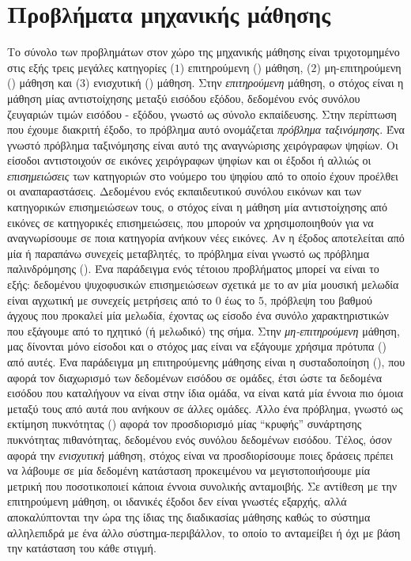 \section{Προβλήματα μηχανικής μάθησης}
Το σύνολο των προβλημάτων στον χώρο της μηχανικής μάθησης είναι τριχοτομημένο στις εξής τρεις μεγάλες κατηγορίες ($1$) επιτηρούμενη () μάθηση, ($2$) μη-επιτηρούμενη () μάθηση και ($3$) ενισχυτική () μάθηση. 
Στην \textit{επιτηρούμενη} μάθηση, ο στόχος είναι η μάθηση μίας αντιστοίχησης μεταξύ εισόδου εξόδου, δεδομένου ενός συνόλου ζευγαριών τιμών εισόδου - εξόδου, γνωστό ως σύνολο εκπαίδευσης.
Στην περίπτωση που έχουμε διακριτή έξοδο, το πρόβλημα αυτό ονομάζεται \textit{πρόβλημα ταξινόμησης}.
Ένα γνωστό πρόβλημα ταξινόμησης είναι αυτό της αναγνώρισης χειρόγραφων ψηφίων.
Οι είσοδοι αντιστοιχούν σε εικόνες χειρόγραφων ψηφίων και οι έξοδοι ή αλλιώς οι \textit{επισημειώσεις} των κατηγοριών στο νούμερο του ψηφίου από το οποίο έχουν προέλθει οι αναπαραστάσεις.
Δεδομένου ενός εκπαιδευτικού συνόλου εικόνων και των κατηγορικών επισημειώσεων τους, ο στόχος είναι η μάθηση μία αντιστοίχησης από εικόνες σε κατηγορικές επισημειώσεις, που μπορούν να χρησιμοποιηθούν για να αναγνωρίσουμε σε ποια κατηγορία ανήκουν νέες εικόνες.
Αν η έξοδος αποτελείται από μία ή παραπάνω συνεχείς μεταβλητές, το πρόβλημα είναι γνωστό ως πρόβλημα παλινδρόμησης ().
Ένα παράδειγμα ενός τέτοιου προβλήματος μπορεί να είναι το εξής: δεδομένου ψυχοφυσικών επισημειώσεων σχετικά με το αν μία μουσική μελωδία είναι αγχωτική με συνεχείς μετρήσεις από το $0$ έως το $5$, πρόβλεψη του βαθμού άγχους που προκαλεί μία μελωδία, έχοντας ως είσοδο ένα συνόλο χαρακτηριστικών που εξάγουμε από το ηχητικό (ή μελωδικό) της σήμα.
Στην \textit{μη-επιτηρούμενη} μάθηση, μας δίνονται μόνο είσοδοι και ο στόχος μας είναι να εξάγουμε χρήσιμα πρότυπα () από αυτές.
Ένα παράδειγμα μη επιτηρούμενης μάθησης είναι η συσταδοποίηση (), που αφορά τον διαχωρισμό των δεδομένων εισόδου σε ομάδες, έτσι ώστε τα δεδομένα εισόδου που καταλήγουν να είναι στην ίδια ομάδα, να είναι κατά μία έννοια πιο όμοια μεταξύ τους από αυτά που ανήκουν σε άλλες ομάδες.
Άλλο ένα πρόβλημα, γνωστό ως εκτίμηση πυκνότητας () αφορά τον προσδιορισμό μίας ``κρυφής'' συνάρτησης πυκνότητας πιθανότητας, δεδομένου ενός συνόλου δεδομένων εισόδου.
Τέλος, όσον αφορά την \textit{ενισχυτική} μάθηση, στόχος είναι να προσδιορίσουμε ποιες δράσεις πρέπει να λάβουμε σε μία δεδομένη κατάσταση προκειμένου να μεγιστοποιήσουμε μία μετρική που ποσοτικοποιεί κάποια έννοια συνολικής ανταμοιβής.
Σε αντίθεση με την επιτηρούμενη μάθηση, οι ιδανικές έξοδοι δεν είναι γνωστές εξαρχής, αλλά αποκαλύπτονται την ώρα της ίδιας της διαδικασίας μάθησης καθώς το σύστημα αλληλεπιδρά με ένα άλλο σύστημα-περιβάλλον, το οποίο το ανταμείβει ή όχι με βάση την κατάσταση του κάθε στιγμή.
